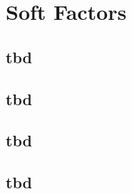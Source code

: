 
\section{Soft Factors}\label{ord:ch5:sec4}


\subsection{tbd}\label{ord:ch5:sec4:subsec1}

\subsection{tbd}\label{ord:ch5:sec4:subsec2}

\subsection{tbd}\label{ord:ch5:sec4:subsec3}

\subsection{tbd}\label{ord:ch5:sec4:subsec4}
